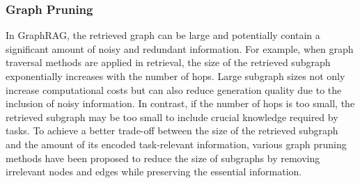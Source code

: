 \subsubsection{Graph Pruning}
In GraphRAG, the retrieved graph can be large and potentially contain a significant amount of noisy and redundant information. For example, when graph traversal methods are applied in retrieval, the size of the retrieved subgraph exponentially increases with the number of hops. Large subgraph sizes not only increase computational costs but can also reduce generation quality due to the inclusion of noisy information. In contrast, if the number of hops is too small, the retrieved subgraph may be too small to include crucial knowledge required by tasks. To achieve a better trade-off between the size of the retrieved subgraph and the amount of its encoded task-relevant information, various graph pruning methods have been proposed to reduce the size of subgraphs by removing irrelevant nodes and edges while preserving the essential information.

